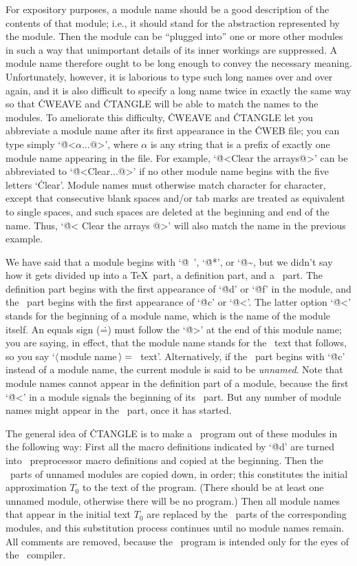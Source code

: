 For expository purposes, a module name should be a good description of the
contents of that module; i.e., it should stand for the abstraction
represented by the module. Then the module can be ``plugged into'' one or
more other modules in such a way
that unimportant details of its inner workings
are suppressed.  A module name therefore ought to be long enough to convey
the necessary meaning. Unfortunately, however, it is laborious to type
such long names over and over again, and it is also difficult to specify a
long name twice in exactly the same way so that \.{CWEAVE} and \.{CTANGLE}
will be able to match the names to the modules. To ameliorate this difficulty,
\.{CWEAVE} and \.{CTANGLE} let you abbreviate a module name
after its first appearance in the \.{CWEB} file; you can type simply
`\.{@<$\alpha$...@>}', where $\alpha$ is any string that is a prefix of
exactly one module name appearing in the file. For example, `\.{@<Clear
the arrays@>}' can be abbreviated to `\.{@<Clear...@>}' if no other module
name begins with the five letters `\.{Clear}'. Module names must otherwise
match character for character, except that consecutive blank spaces and/or
tab marks are treated as equivalent to single spaces, and such spaces are
deleted at the beginning and end of the name. Thus, `\.{@< Clear { }the
arrays @>}' will also match the name in the previous example.

We have said that a module begins with `\.{@\ }', `\.{@*}', or `\.{@\~}, but
we didn't say how it gets divided up into a \TeX\ part, a definition part,
and a \Cee\ part. The definition part begins with the first appearance
of `\.{@d}' or `\.{@f}' in the module, and the \Cee\ part begins with
the first appearance of `\.{@c}' or `\.{@<}'. The latter option `\.{@<}'
stands for the beginning of a module name, which is the name of the module
itself. An equals sign (\.=) must follow the `\.{@>}' at the end of this
module name; you are saying, in effect, that the module name stands for
the \Cee\ text that follows, so you say `$\langle\,$module
name$\,\rangle=\null$\Cee\ text'. Alternatively, if the \Cee\ part
begins with `\.{@c}' instead of a module name, the current module is said
to be {\sl unnamed}. Note that module names cannot appear in the
definition part of a module, because the first `\.{@<}' in a module
signals the beginning of its \Cee\ part.  But any number of module names
might appear in the \Cee\ part, once it has started.

The general idea of \.{CTANGLE} is to make a \Cee\ program out of these
modules in the following way: First all the macro definitions
indicated by `\.{@d}' are turned into \Cee\ preprocessor macro definitions
and copied at the beginning.
Then the \Cee\ parts of unnamed modules are copied down,
in order; this constitutes the initial
approximation $T_0$ to the text of the program. (There should be at least
one unnamed module, otherwise there will be no program.) Then all module
names that appear in the initial text $T_0$ are replaced by the \Cee\
parts of the corresponding modules, and this substitution process
continues until no module names remain. All comments are removed, because
the \Cee\ program is intended only for the eyes of the \Cee\ compiler.

